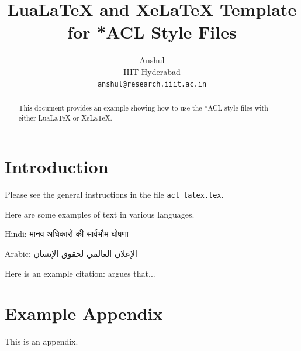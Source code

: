 \documentclass[11pt]{article}
\title{LuaLaTeX and XeLaTeX Template for *ACL Style Files}
\author{
  Anshul \\
  IIIT Hyderabad \\
  \texttt{anshul@research.iiit.ac.in}
}
\begin{document}
\maketitle
\begin{abstract}
This document provides an example showing how
to use the *ACL style files with either
LuaLaTeX or XeLaTeX.
\end{abstract}


\section{Introduction}

Please see the general instructions
in the file \verb|acl_latex.tex|.

Here are some examples of text in various languages.

Hindi: \foreignlanguage{hindi}{मानव अधिकारों की सार्वभौम घोषणा}

Arabic: \foreignlanguage{arabic}{الإعلان العالمي لحقوق الإنسان}

Here is an example citation:
\citet{Gusfield:97} argues that...




\appendix

\section{Example Appendix}
\label{sec:appendix}

This is an appendix.
\end{document}
